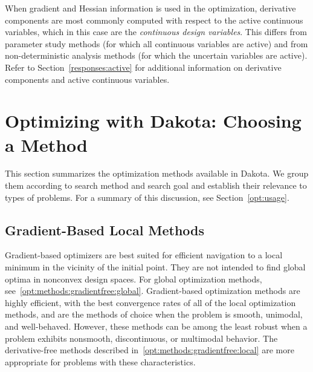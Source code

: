 When gradient and Hessian information is used in the optimization,
derivative components are most commonly computed with respect to the
active continuous variables, which in this case are the
\emph{continuous design variables}. This differs from parameter study
methods (for which all continuous variables are active) and from
non-deterministic analysis methods (for which the uncertain variables
are active). Refer to Section~\ref{responses:active} for additional
information on derivative components and active continuous variables.

\section{Optimizing with Dakota: Choosing a Method}
\label{opt:methods}

This section summarizes the optimization methods available in
Dakota. We group them according to search method and search goal and
establish their relevance to types of problems. For a summary of this
discussion, see Section~\ref{opt:usage}.

\subsection{Gradient-Based Local Methods}
\label{opt:methods:gradient}

Gradient-based optimizers are best suited for efficient navigation to
a local minimum in the vicinity of the initial point.  They are not
intended to find global optima in nonconvex design spaces.  For global
optimization methods, see~\ref{opt:methods:gradientfree:global}.
Gradient-based optimization methods are highly efficient, with the
best convergence rates of all of the local optimization methods, and
are the methods of choice when the problem is smooth, unimodal, and
well-behaved. However, these methods can be among the least robust
when a problem exhibits nonsmooth, discontinuous, or multimodal
behavior.  The derivative-free methods described
in~\ref{opt:methods:gradientfree:local} are more appropriate for
problems with these characteristics.

